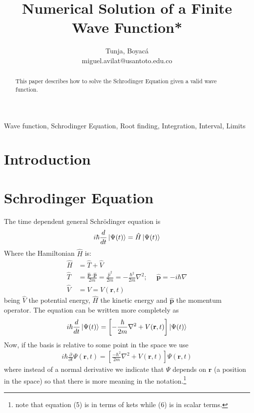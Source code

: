 \documentclass[conference]{IEEEtran}
\begin{document}
\title{Numerical Solution of a Finite Wave Function*}

\author{
	Tunja, Boyacá\\
	miguel.avilat@usantoto.edu.co
}

\maketitle

\begin{abstract}
	This paper describes how to solve the Schrodinger Equation given a valid wave function.
\end{abstract}

\begin{IEEEkeywords}
	Wave function, Schrodinger Equation, Root finding, Integration, Interval, Limits
\end{IEEEkeywords}

\section{Introduction}

\section{Schrodinger Equation}
The time dependent general Schrödinger equation\cite{1} is
\begin{gather}
	i\hbar\frac{d}{dt}\ket{\Psi(t)} = \hat{H}\ket{\Psi(t)}
\end{gather}
Where the Hamiltonian $\hat{H}$ is:
\begin{align}
	\hat{H} &= \hat{T} + \hat{V}\\
	\hat{T} &= \frac{\mathbf{\hat{p}}\cdot\mathbf{\hat{p}}}{2m} = \frac{\hat{p}^2}{2m} = -\frac{\hbar^2}{2m}\nabla^2;~~~~~~\mathbf{\hat{p}}=-i\hbar\nabla\\
	\hat{V} &= V = V(\mathbf{r},t)
\end{align}
being $\hat{V}$ the potential energy, $\hat{H}$ the kinetic energy and $\mathbf{\hat{p}}$ the momentum operator. The equation can be written more completely as
\begin{gather}
	i\hbar\frac{d}{dt}\ket{\Psi(t)} = \left[ -\frac{\hbar}{2m}\nabla^2 + V(\mathbf{r},t) \right] \ket{\Psi(t)}
\end{gather}
Now, if the basis is relative to some point in the space we use\cite{2}
\begin{gather}
	i\hbar\frac{\partial}{\partial t}\Psi(\mathbf{r},t) = \left[\frac{-\hbar^2}{2m}\nabla^2 + V(\mathbf{r},t) \right] \Psi(\mathbf{r},t)
\end{gather}
where instead of a normal derivative we indicate that $\Psi$ depends on $\mathbf{r}$ (a position in the space) so that there is more meaning in the notation.\footnote{note that equation (5) is in terms of kets while (6) is in scalar terms.}
\end{document}
